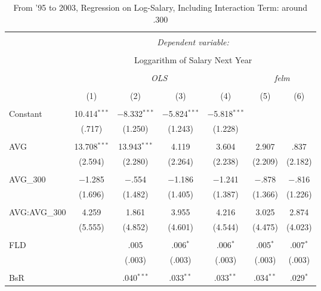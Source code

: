
\begin{table}[H] \centering
  \caption{From '95 to 2003, Regression on Log-Salary, Including Interaction Term: around .300}
  \label{AVG300_C}
\tiny
\begin{tabular}{@{\extracolsep{5pt}}lcccccc}
\\[-1.8ex]\hline
\hline \\[-1.8ex]
 & \multicolumn{6}{c}{\textit{Dependent variable:}} \\
\cline{2-7}
\\[-1.8ex] & \multicolumn{6}{c}{Loggarithm of Salary Next Year} \\
\\[-1.8ex] & \multicolumn{4}{c}{\textit{OLS}} & \multicolumn{2}{c}{\textit{felm}} \\
\\[-1.8ex] & (1) & (2) & (3) & (4) & (5) & (6)\\
\hline \\[-1.8ex]
 Constant & 10.414$^{***}$ & $-$8.332$^{***}$ & $-$5.824$^{***}$ & $-$5.818$^{***}$ &  &  \\
  & (.717) & (1.250) & (1.243) & (1.228) &  &  \\
  & & & & & & \\
 AVG & 13.708$^{***}$ & 13.943$^{***}$ & 4.119 & 3.604 & 2.907 & .837 \\
  & (2.594) & (2.280) & (2.264) & (2.238) & (2.209) & (2.182) \\
  & & & & & & \\
 AVG\_300 & $-$1.285 & $-$.554 & $-$1.186 & $-$1.241 & $-$.878 & $-$.816 \\
 & (1.696) & (1.482) & (1.405) & (1.387) & (1.366) & (1.226) \\
 & & & & & & \\
 AVG:AVG\_300 & 4.259 & 1.861 & 3.955 & 4.216 & 3.025 & 2.874 \\
 & (5.555) & (4.852) & (4.601) & (4.544) & (4.475) & (4.023) \\
 & & & & & & \\
 FLD &  & .005 & .006$^{*}$ & .006$^{*}$ & .005$^{*}$ & .007$^{*}$ \\
  &  & (.003) & (.003) & (.003) & (.003) & (.003) \\
  & & & & & & \\
 BsR &  & .040$^{***}$ & .033$^{**}$ & .033$^{**}$ & .034$^{**}$ & .029$^{*}$ \\

\end{tabular}
\end{table}
